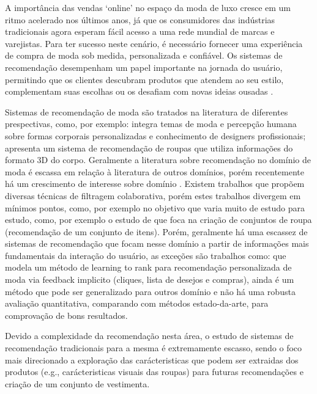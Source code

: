 \documentclass[sigconf]{acmart}
\begin{document}
A importância das vendas ‘online’ no espaço da moda de luxo cresce em um ritmo acelerado nos últimos anos, já que os consumidores das indústrias tradicionais agora esperam fácil acesso a uma rede mundial de marcas e varejistas. Para ter sucesso neste cenário, é necessário fornecer uma experiência de compra de moda sob medida, personalizada e confiável. Os sistemas de recomendação desempenham um papel importante na jornada do usuário, permitindo que os clientes descubram produtos que atendem ao seu estilo, complementam suas escolhas ou os desafiam com novas ideias ousadas \cite{farfetchfashionrecommendationschallenge2021}.

Sistemas de recomendação de moda são tratados na literatura de diferentes prespectivas, como, por exemplo: \citeauthor{wang2014intelligent} integra temas de moda e percepção humana sobre formas corporais personalizadas e conhecimento de designers profissionais; \cite{dong2020interactive} apresenta um sistema de recomendação de roupas que utiliza informações do formato 3D do corpo. Geralmente a literatura sobre recomendação no domínio de moda é escassa em relação à literatura de outros domínios, porém recentemente há um crescimento de interesse sobre domínio \cite{he2016ups,frejlichowski2016finding,wakita2015fashion,kang2017visually,zeng2013intelligent}. Existem trabalhos que propõem diversas técnicas de filtragem colaborativa, porém estes trabalhos divergem em mínimos pontos, como, por exemplo no objetivo que varia muito de estudo para estudo, como, por exemplo o estudo de \citeauthor{hu2015collaborative} que foca na criação de conjuntos de roupa (recomendação de um conjunto de itens). Porém, geralmente há uma escassez de sistemas de recomendação que focam nesse domínio a partir de informações mais fundamentais da interação do usuário, as exceções são trabalhos como: \citeauthor{nguyen2014learning} que modela um método de learning to rank para recomendação personalizada de moda via feedback implicito (cliques, lista de desejos e compras), ainda é um método que pode ser generalizado para outros domínio e não há uma robusta avaliação quantitativa, comparando com métodos estado-da-arte, para comprovação de bons resultados.

Devido a complexidade da recomendação nesta área, o estudo de sistemas de recomendação tradicionais para a mesma é extremamente escasso, sendo o foco mais direcionado a exploração das carácteristicas que podem ser extraidas dos produtos (e.g., carácteristicas visuais das roupas) para futuras recomendações e criação de um conjunto de vestimenta.
\end{document}
